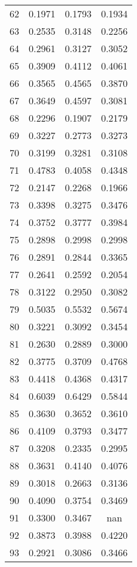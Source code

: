 \begin{table}[ht]
\begin{tabular}{|c|c|c|c|}
62  &  0.1971   &  0.1793   &  0.1934 \\ 
63  &  0.2535   &  0.3148   &  0.2256 \\ 
64  &  0.2961   &  0.3127   &  0.3052 \\ 
65  &  0.3909   &  0.4112   &  0.4061 \\ 
66  &  0.3565   &  0.4565   &  0.3870 \\ 
67  &  0.3649   &  0.4597   &  0.3081 \\ 
68  &  0.2296   &  0.1907   &  0.2179 \\ 
69  &  0.3227   &  0.2773   &  0.3273 \\ 
70  &  0.3199   &  0.3281   &  0.3108 \\ 
71  &  0.4783   &  0.4058   &  0.4348 \\ 
72  &  0.2147   &  0.2268   &  0.1966 \\ 
73  &  0.3398   &  0.3275   &  0.3476 \\ 
74  &  0.3752   &  0.3777   &  0.3984 \\ 
75  &  0.2898   &  0.2998   &  0.2998 \\ 
76  &  0.2891   &  0.2844   &  0.3365 \\ 
77  &  0.2641   &  0.2592   &  0.2054 \\ 
78  &  0.3122   &  0.2950   &  0.3082 \\ 
79  &  0.5035   &  0.5532   &  0.5674 \\ 
80  &  0.3221   &  0.3092   &  0.3454 \\ 
81  &  0.2630   &  0.2889   &  0.3000 \\ 
82  &  0.3775   &  0.3709   &  0.4768 \\ 
83  &  0.4418   &  0.4368   &  0.4317 \\ 
84  &  0.6039   &  0.6429   &  0.5844 \\ 
85  &  0.3630   &  0.3652   &  0.3610 \\ 
86  &  0.4109   &  0.3793   &  0.3477 \\ 
87  &  0.3208   &  0.2335   &  0.2995 \\ 
88  &  0.3631   &  0.4140   &  0.4076 \\ 
89  &  0.3018   &  0.2663   &  0.3136 \\ 
90  &  0.4090   &  0.3754   &  0.3469 \\ 
91  &  0.3300   &  0.3467   &  nan \\ 
92  &  0.3873   &  0.3988   &  0.4220 \\ 
93  &  0.2921   &  0.3086   &  0.3466 \\ 

\end{tabular}
\end{table}
